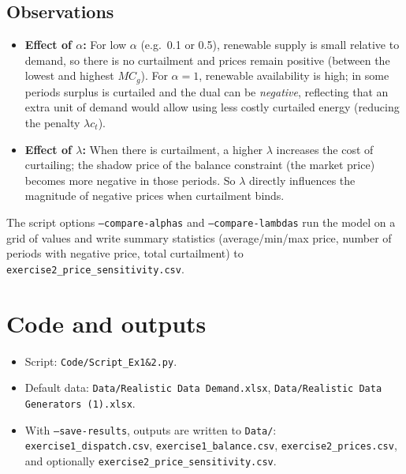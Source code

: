 \documentclass[11pt,a4paper]{article}
\begin{document}
\subsection{Observations}
\begin{itemize}
  \item \textbf{Effect of $\alpha$:} For low $\alpha$ (e.g.\ 0.1 or 0.5), renewable supply is small relative to demand, so there is no curtailment and prices remain positive (between the lowest and highest $MC_g$). For $\alpha = 1$, renewable availability is high; in some periods surplus is curtailed and the dual can be \emph{negative}, reflecting that an extra unit of demand would allow using less costly curtailed energy (reducing the penalty $\lambda c_t$).
  \item \textbf{Effect of $\lambda$:} When there is curtailment, a higher $\lambda$ increases the cost of curtailing; the shadow price of the balance constraint (the market price) becomes more negative in those periods. So $\lambda$ directly influences the magnitude of negative prices when curtailment binds.
\end{itemize}

The script options \texttt{--compare-alphas} and \texttt{--compare-lambdas} run the model on a grid of values and write summary statistics (average/min/max price, number of periods with negative price, total curtailment) to \texttt{exercise2\_price\_sensitivity.csv}.

\section*{Code and outputs}
\begin{itemize}
  \item Script: \texttt{Code/Script\_Ex1\&2.py}.
  \item Default data: \texttt{Data/Realistic Data Demand.xlsx}, \texttt{Data/Realistic Data Generators (1).xlsx}.
  \item With \texttt{--save-results}, outputs are written to \texttt{Data/}: \texttt{exercise1\_dispatch.csv}, \texttt{exercise1\_balance.csv}, \texttt{exercise2\_prices.csv}, and optionally \texttt{exercise2\_price\_sensitivity.csv}.
\end{itemize}
\end{document}
